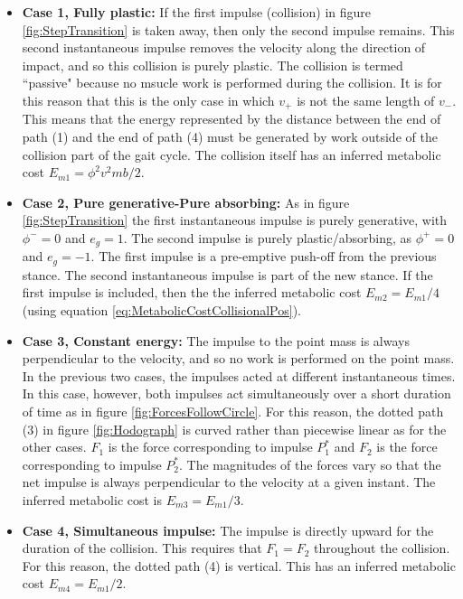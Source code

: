 \begin{itemize}
\item \textbf{Case 1, Fully plastic:} If the first impulse (collision) in figure \ref{fig:StepTransition} is taken away, then only the second impulse remains. This second instantaneous impulse removes the velocity along the direction of impact, and so this collision is purely plastic. The collision is termed ``passive" because no msucle work is performed during the collision. It is for this reason that this is the only case in which $v_{+}$ is not the same length of $v_{-}$. This means that the energy represented by the distance between the end of path (1) and the end of path (4) must be generated by work outside of the collision part of the gait cycle. The collision itself has an inferred metabolic cost $E_{m1} = \phi^{2} v^{2} m b/2$.

\item \textbf{Case 2, Pure generative-Pure absorbing:} As in figure \ref{fig:StepTransition} the first instantaneous impulse is purely generative, with $\phi^{-} = 0$ and $e_{g} = 1$. The second impulse is purely plastic/absorbing, as $\phi^{+} = 0$ and $e_{g} = -1$. The first impulse is a pre-emptive push-off from the previous stance. The second instantaneous impulse is part of the new stance.  If the first impulse is included, then the the inferred metabolic cost $E_{m2} = E_{m1}/4$ (using equation \ref{eq:MetabolicCostCollisionalPos}).

\item \textbf{Case 3, Constant energy:} The impulse to the point mass is always perpendicular to the velocity, and so no work is performed on the point mass. In the previous two cases, the impulses acted at different instantaneous times. In this case, however, both impulses act simultaneously over a short duration  of time as in figure \ref{fig:ForcesFollowCircle}. For this reason, the dotted path (3) in figure \ref{fig:Hodograph} is curved rather than piecewise linear as for the other cases. $F_{1}$ is the force corresponding to impulse $P_1^*$ and $F_{2}$ is the force corresponding to impulse $P_2^*$. The magnitudes of the forces vary so that the net impulse is always perpendicular to the velocity at a given instant. The inferred metabolic cost is $E_{m3} = E_{m1}/3$.

\item \textbf{Case 4, Simultaneous impulse:} The impulse is directly upward for the duration of the collision. This requires that $F_{1} = F_{2}$ throughout the collision. For this reason, the dotted path (4) is vertical. This has an inferred metabolic cost $E_{m4} = E_{m1}/2$.
\end{itemize}

